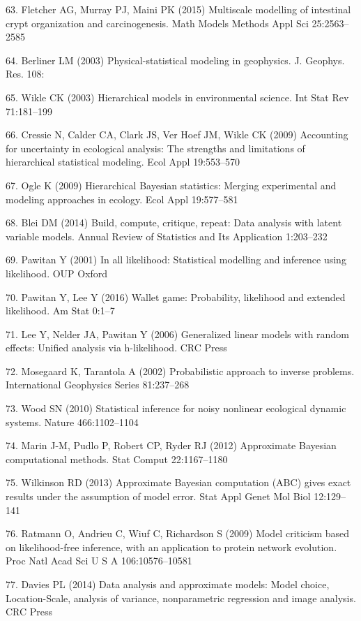 \documentclass[10pt,letterpaper]{article}
\begin{document}
\hypertarget{ref-Fletcher2015-yc}{}
63. Fletcher AG, Murray PJ, Maini PK (2015) Multiscale modelling of
intestinal crypt organization and carcinogenesis. Math Models Methods
Appl Sci 25:2563--2585

\hypertarget{ref-Berliner2003-yl}{}
64. Berliner LM (2003) Physical-statistical modeling in geophysics. J.
Geophys. Res. 108:

\hypertarget{ref-Wikle2003-je}{}
65. Wikle CK (2003) Hierarchical models in environmental science. Int
Stat Rev 71:181--199

\hypertarget{ref-Cressie2009-wy}{}
66. Cressie N, Calder CA, Clark JS, Ver Hoef JM, Wikle CK (2009)
Accounting for uncertainty in ecological analysis: The strengths and
limitations of hierarchical statistical modeling. Ecol Appl 19:553--570

\hypertarget{ref-Ogle2009-cb}{}
67. Ogle K (2009) Hierarchical Bayesian statistics: Merging experimental
and modeling approaches in ecology. Ecol Appl 19:577--581

\hypertarget{ref-Blei2014-dh}{}
68. Blei DM (2014) Build, compute, critique, repeat: Data analysis with
latent variable models. Annual Review of Statistics and Its Application
1:203--232

\hypertarget{ref-Pawitan2001-xm}{}
69. Pawitan Y (2001) In all likelihood: Statistical modelling and
inference using likelihood. OUP Oxford

\hypertarget{ref-Pawitan2016-cz}{}
70. Pawitan Y, Lee Y (2016) Wallet game: Probability, likelihood and
extended likelihood. Am Stat 0:1--7

\hypertarget{ref-Lee2006-mr}{}
71. Lee Y, Nelder JA, Pawitan Y (2006) Generalized linear models with
random effects: Unified analysis via h-likelihood. CRC Press

\hypertarget{ref-Mosegaard2002-lx}{}
72. Mosegaard K, Tarantola A (2002) Probabilistic approach to inverse
problems. International Geophysics Series 81:237--268

\hypertarget{ref-Wood2010-hp}{}
73. Wood SN (2010) Statistical inference for noisy nonlinear ecological
dynamic systems. Nature 466:1102--1104

\hypertarget{ref-Marin2012-fd}{}
74. Marin J-M, Pudlo P, Robert CP, Ryder RJ (2012) Approximate Bayesian
computational methods. Stat Comput 22:1167--1180

\hypertarget{ref-Wilkinson2013-rs}{}
75. Wilkinson RD (2013) Approximate Bayesian computation (ABC) gives
exact results under the assumption of model error. Stat Appl Genet Mol
Biol 12:129--141

\hypertarget{ref-Ratmann2009-de}{}
76. Ratmann O, Andrieu C, Wiuf C, Richardson S (2009) Model criticism
based on likelihood-free inference, with an application to protein
network evolution. Proc Natl Acad Sci U S A 106:10576--10581

\hypertarget{ref-Davies2014-dz}{}
77. Davies PL (2014) Data analysis and approximate models: Model choice,
Location-Scale, analysis of variance, nonparametric regression and image
analysis. CRC Press
\end{document}

